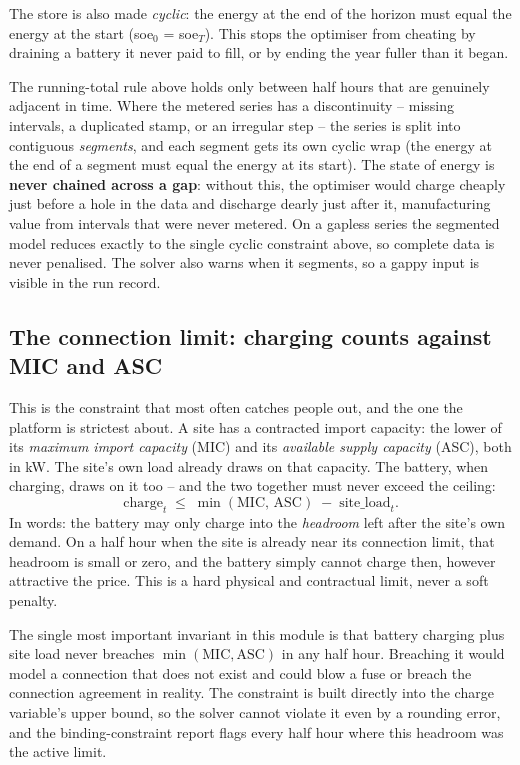 The store is also made \emph{cyclic}: the energy at the end of the horizon must equal the energy at the start (soe$_0$ = soe$_T$). This stops the optimiser from cheating by draining a battery it never paid to fill, or by ending the year fuller than it began.

\begin{caution}
The running-total rule above holds only between half hours that are genuinely adjacent in time. Where the metered series has a discontinuity -- missing intervals, a duplicated stamp, or an irregular step -- the series is split into contiguous \emph{segments}, and each segment gets its own cyclic wrap (the energy at the end of a segment must equal the energy at its start). The state of energy is \textbf{never chained across a gap}: without this, the optimiser would charge cheaply just before a hole in the data and discharge dearly just after it, manufacturing value from intervals that were never metered. On a gapless series the segmented model reduces exactly to the single cyclic constraint above, so complete data is never penalised. The solver also warns when it segments, so a gappy input is visible in the run record.
\end{caution}

\subsection{The connection limit: charging counts against MIC and ASC}

This is the constraint that most often catches people out, and the one the platform is strictest about. A site has a contracted import capacity: the lower of its \emph{maximum import capacity} (MIC) and its \emph{available supply capacity} (ASC), both in kW. The site's own load already draws on that capacity. The battery, when charging, draws on it too -- and the two together must never exceed the ceiling:
\[
\text{charge}_t \;\le\; \min(\text{MIC},\,\text{ASC}) \;-\; \text{site\_load}_t .
\]
In words: the battery may only charge into the \emph{headroom} left after the site's own demand. On a half hour when the site is already near its connection limit, that headroom is small or zero, and the battery simply cannot charge then, however attractive the price. This is a hard physical and contractual limit, never a soft penalty.

\begin{caution}
The single most important invariant in this module is that battery charging plus site load never breaches $\min(\text{MIC}, \text{ASC})$ in any half hour. Breaching it would model a connection that does not exist and could blow a fuse or breach the connection agreement in reality. The constraint is built directly into the charge variable's upper bound, so the solver cannot violate it even by a rounding error, and the binding-constraint report flags every half hour where this headroom was the active limit.
\end{caution}

